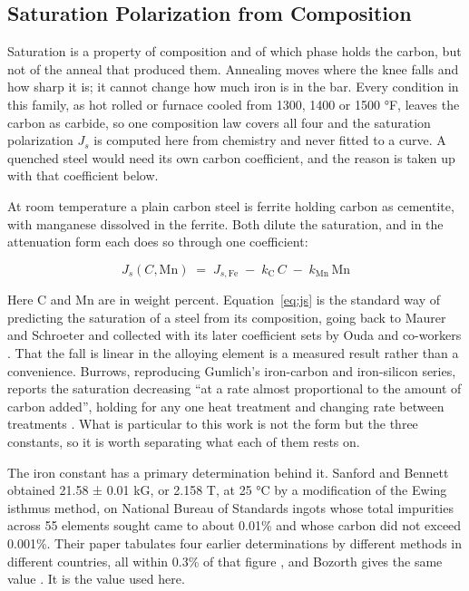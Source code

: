 \documentclass[
  11pt,
]{article}
\begin{document}
\subsection{Saturation Polarization from Composition}\label{saturation-polarization-from-composition}

Saturation is a property of composition and of which phase holds the carbon, but not of the anneal that produced them. Annealing moves where the knee falls and how sharp it is; it cannot change how much iron is in the bar. Every condition in this family, as hot rolled or furnace cooled from 1300, 1400 or 1500 °F, leaves the carbon as carbide, so one composition law covers all four and the saturation polarization \(J_s\) is computed here from chemistry and never fitted to a curve. A quenched steel would need its own carbon coefficient, and the reason is taken up with that coefficient below.

At room temperature a plain carbon steel is ferrite holding carbon as cementite, with manganese dissolved in the ferrite. Both dilute the saturation, and in the attenuation form each does so through one coefficient:

\begin{equation}\label{eq:js}
J_s(C,\mathrm{Mn}) \;=\; J_{s,\mathrm{Fe}} \;-\; k_{\mathrm{C}}\,C \;-\; k_{\mathrm{Mn}}\,\mathrm{Mn}
\end{equation}

Here C and Mn are in weight percent. Equation~\eqref{eq:js} is the standard way of predicting the saturation of a steel from its composition, going back to Maurer and Schroeter \cite{maurer1929} and collected with its later coefficient sets by Ouda and co-workers \cite{ouda2018}. That the fall is linear in the alloying element is a measured result rather than a convenience. Burrows, reproducing Gumlich's iron-carbon and iron-silicon series, reports the saturation decreasing ``at a rate almost proportional to the amount of carbon added'', holding for any one heat treatment and changing rate between treatments \cite{burrows1916}. What is particular to this work is not the form but the three constants, so it is worth separating what each of them rests on.

The iron constant has a primary determination behind it. Sanford and Bennett obtained 21.58 ± 0.01 kG, or 2.158 T, at 25 °C by a modification of the Ewing isthmus method, on National Bureau of Standards ingots whose total impurities across 55 elements sought came to about 0.01\% and whose carbon did not exceed 0.001\%. Their paper tabulates four earlier determinations by different methods in different countries, all within 0.3\% of that figure \cite{sanford1941}, and Bozorth gives the same value \cite{bozorth1951}. It is the value used here.
\end{document}
